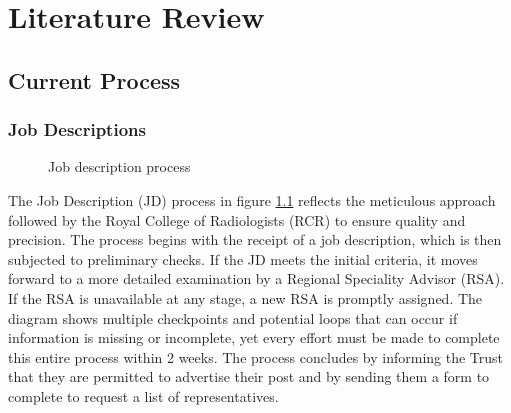 \chapter{Literature Review}
\section{Current Process}
\subsection{Job Descriptions}
\begin{figure}[h]
\centering
{}
\vspace{-20pt}
\caption{Job description process}
\label{fig:jd}
\end{figure}
\vspace{-5pt}
The Job Description (JD) process in figure \ref{fig:jd} reflects the meticulous approach followed by the Royal College of Radiologists (RCR) to ensure quality and precision. The process begins with the receipt of a job description, which is then subjected to preliminary checks. If the JD meets the initial criteria, it moves forward to a more detailed examination by a Regional Speciality Advisor (RSA). If the RSA is unavailable at any stage, a new RSA is promptly assigned. The diagram shows multiple checkpoints and potential loops that can occur if information is missing or incomplete, yet every effort must be made to complete this entire process within 2 weeks. The process concludes by informing the Trust that they are permitted to advertise their post and by sending them a form to complete to request a list of representatives.

